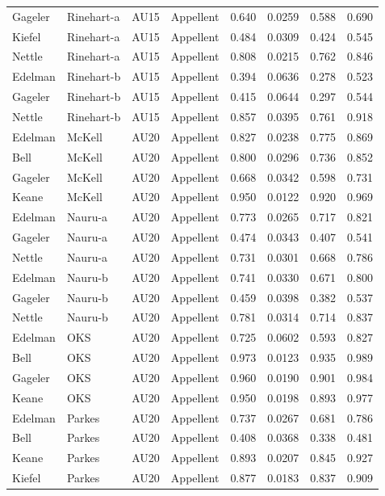 \documentclass{monashthesis}
\begin{document}
\begin{center}
\begin{longtable}{llllllll}
Gageler & Rinehart-a & AU15 & Appellent & 0.640 & 0.0259 & 0.588 & 0.690 \\
Kiefel & Rinehart-a & AU15 & Appellent & 0.484 & 0.0309 & 0.424 & 0.545 \\
Nettle & Rinehart-a & AU15 & Appellent & 0.808 & 0.0215 & 0.762 & 0.846 \\
Edelman & Rinehart-b & AU15 & Appellent & 0.394 & 0.0636 & 0.278 & 0.523 \\
Gageler & Rinehart-b & AU15 & Appellent & 0.415 & 0.0644 & 0.297 & 0.544 \\
Nettle & Rinehart-b & AU15 & Appellent & 0.857 & 0.0395 & 0.761 & 0.918 \\
Edelman & McKell & AU20 & Appellent & 0.827 & 0.0238 & 0.775 & 0.869 \\
Bell & McKell & AU20 & Appellent & 0.800 & 0.0296 & 0.736 & 0.852 \\
Gageler & McKell & AU20 & Appellent & 0.668 & 0.0342 & 0.598 & 0.731 \\
Keane & McKell & AU20 & Appellent & 0.950 & 0.0122 & 0.920 & 0.969 \\
Edelman & Nauru-a & AU20 & Appellent & 0.773 & 0.0265 & 0.717 & 0.821 \\
Gageler & Nauru-a & AU20 & Appellent & 0.474 & 0.0343 & 0.407 & 0.541 \\
Nettle & Nauru-a & AU20 & Appellent & 0.731 & 0.0301 & 0.668 & 0.786 \\
Edelman & Nauru-b & AU20 & Appellent & 0.741 & 0.0330 & 0.671 & 0.800 \\
Gageler & Nauru-b & AU20 & Appellent & 0.459 & 0.0398 & 0.382 & 0.537 \\
Nettle & Nauru-b & AU20 & Appellent & 0.781 & 0.0314 & 0.714 & 0.837 \\
Edelman & OKS & AU20 & Appellent & 0.725 & 0.0602 & 0.593 & 0.827 \\
Bell & OKS & AU20 & Appellent & 0.973 & 0.0123 & 0.935 & 0.989 \\
Gageler & OKS & AU20 & Appellent & 0.960 & 0.0190 & 0.901 & 0.984 \\
Keane & OKS & AU20 & Appellent & 0.950 & 0.0198 & 0.893 & 0.977 \\
Edelman & Parkes & AU20 & Appellent & 0.737 & 0.0267 & 0.681 & 0.786 \\
Bell & Parkes & AU20 & Appellent & 0.408 & 0.0368 & 0.338 & 0.481 \\
Keane & Parkes & AU20 & Appellent & 0.893 & 0.0207 & 0.845 & 0.927 \\
Kiefel & Parkes & AU20 & Appellent & 0.877 & 0.0183 & 0.837 & 0.909 \\

\end{longtable}
\end{center}
\end{document}

